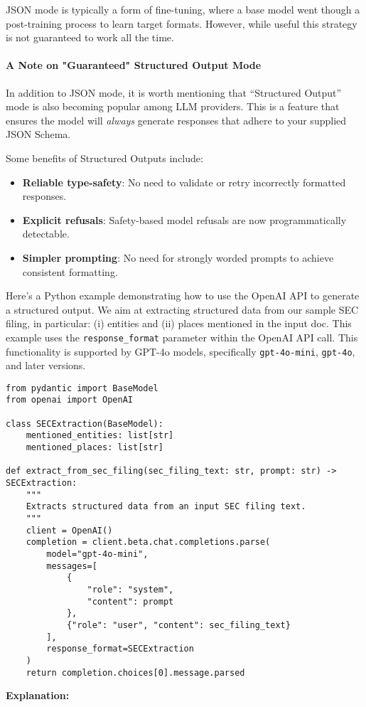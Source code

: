 JSON mode is typically a form of fine-tuning, where a base model went though a post-training process to learn target formats. However, while useful this strategy is not guaranteed to work all the time.

\paragraph{A Note on "Guaranteed" Structured Output Mode}

In addition to JSON mode, it is worth mentioning that ``Structured Output'' mode is also becoming popular among LLM providers. This is a feature that ensures the model will \textit{always} generate responses that adhere to your supplied JSON Schema.

Some benefits of Structured Outputs include:
\begin{itemize}
    \item \textbf{Reliable type-safety}: No need to validate or retry incorrectly formatted responses.
    \item \textbf{Explicit refusals}: Safety-based model refusals are now programmatically detectable.
    \item \textbf{Simpler prompting}: No need for strongly worded prompts to achieve consistent formatting.
\end{itemize}

Here's a Python example demonstrating how to use the OpenAI API to generate a structured output. We aim at extracting structured data from our sample SEC filing, in particular: (i) entities and (ii) places mentioned in the input doc. This example uses the \texttt{response\_format} parameter within the OpenAI API call. This functionality is supported by GPT-4o models, specifically \texttt{gpt-4o-mini}, \texttt{gpt-4o}, and later versions.

\begin{verbatim}
from pydantic import BaseModel
from openai import OpenAI

class SECExtraction(BaseModel):
    mentioned_entities: list[str]
    mentioned_places: list[str]

def extract_from_sec_filing(sec_filing_text: str, prompt: str) -> SECExtraction:
    """
    Extracts structured data from an input SEC filing text.
    """
    client = OpenAI()
    completion = client.beta.chat.completions.parse(
        model="gpt-4o-mini",
        messages=[
            {
                "role": "system",
                "content": prompt
            },
            {"role": "user", "content": sec_filing_text}
        ],
        response_format=SECExtraction
    )
    return completion.choices[0].message.parsed
\end{verbatim}
\textbf{Explanation:}

